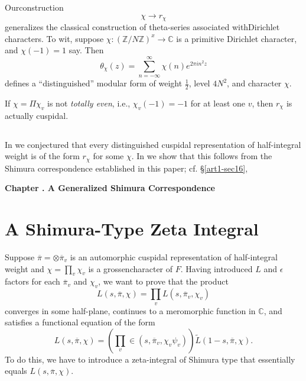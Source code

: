 Our\pageoriginale construction
$$
\chi\to r_{\chi}
$$
generalizes the classical construction of theta-series associated with\break Dirichlet characters. To wit, suppose $\chi:(\mathbb{Z}/N\mathbb{Z})^{x}\to \mathbb{C}$ is a primitive Dirichlet character, and $\chi(-1)=1$ say. Then
$$
\theta_{\chi}(z)=\sum\limits^{\infty}_{n=-\infty}\chi(n)e^{2\pi in^{2}z}
$$
defines a ``distinguished'' modular form of weight $\frac{1}{2}$, level $4N^{2}$, and character $\chi$.

If $\chi=\Pi \chi_{v}$ is not {\em totally even}, i.e., $\chi_{v}(-1)=-1$ for at least one $v$, then $r_{\chi}$ is actually cuspidal.

\subsection{}\label{art1-sec11.3}
In \cite{GePS} we conjectured that every distinguished cuspidal representation of half-integral weight is of the form $r_{\chi}$ for some $\chi$. In \cite{GePS2} we show that this follows from the Shimura correspondence established in this paper; cf. \S\ref{art1-sec16},

\bigskip
\begin{center}
{\large\bfseries Chapter .\label{art1-chap-III} A Generalized Shimura Correspondence}
\end{center}
\smallskip

\section{A Shimura-Type Zeta Integral}\label{art1-sec12}

Suppose $\overline{\pi}=\otimes \overline{\pi}_{v}$ is an automorphic cuspidal representation of half-integral weight and $\chi=\prod\limits_{v}\chi_{v}$ is a grossencharacter of $F$. Having introduced $L$ and $\epsilon$ factors for each $\overline{\pi}_{v}$ and $\chi_{v}$, we want to prove that the product
$$
L(s,\overline{\pi},\chi)=\prod\limits_{v}L(s,\overline{\pi}_{v},\chi_{v})
$$
converges in some half-plane, continues to a meromorphic function in $\mathbb{C}$, and satisfies a functional equation of the form
$$
L(s,\overline{\pi},\chi)=\left(\prod\limits_{v}\in (s,\overline{\pi}_{v},\chi_{v}\psi_{v})\right)\widetilde{L}(1-s,\overline{\pi},\chi).
$$
To do this, we have to introduce a zeta-integral of Shimura type that essentially equals $L(s,\overline{\pi},\chi)$.

